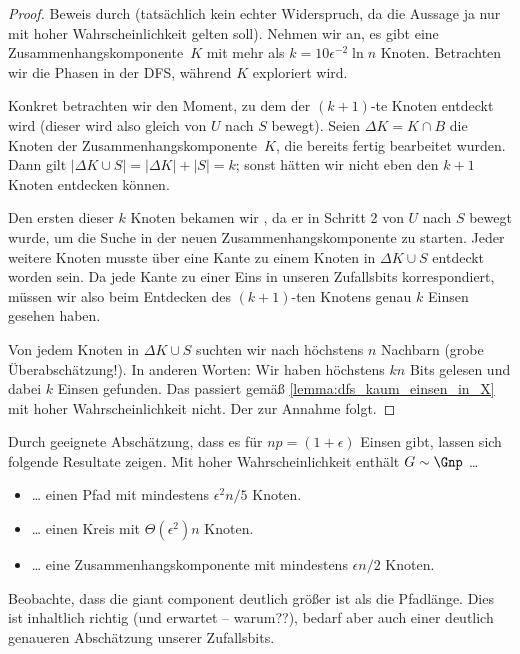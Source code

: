 \begin{proof}
    Beweis durch  (tatsächlich kein echter Widerspruch, da die Aussage ja nur mit hoher Wahrscheinlichkeit gelten soll).
    Nehmen wir an, es gibt eine Zusammenhangskomponente~$K$ mit mehr als $k = 10 \epsilon^{-2} \ln n$ Knoten.
    Betrachten wir die Phasen in der DFS, während $K$ exploriert wird.

    Konkret betrachten wir den Moment, zu dem der $(k+1)$-te Knoten entdeckt wird (dieser wird also gleich von $U$ nach $S$ bewegt).
    Seien $\Delta K = K \cap B$ die Knoten der Zusammenhangskomponente~$K$, die bereits fertig bearbeitet wurden.
    Dann gilt $|\Delta K \cup S| = |\Delta K| + |S| = k$; sonst hätten wir nicht eben den $k+1$ Knoten entdecken können.

    Den ersten dieser $k$ Knoten bekamen wir , da er in Schritt 2 von $U$ nach $S$ bewegt wurde, um die Suche in der neuen Zusammenhangskomponente zu starten.
    Jeder weitere Knoten musste über eine Kante zu einem Knoten in $\Delta K \cup S$ entdeckt worden sein.
    Da jede Kante zu einer Eins in unseren Zufallsbits korrespondiert, müssen wir also beim Entdecken des $(k+1)$-ten Knotens genau $k$ Einsen gesehen haben.

    Von jedem Knoten in $\Delta K \cup S$ suchten wir nach höchstens $n$ Nachbarn (grobe Überabschätzung!).
    In anderen Worten: Wir haben höchstens $k n$ Bits gelesen und dabei $k$ Einsen gefunden.
    Das passiert gemäß \cref{lemma:dfs_kaum_einsen_in_X} mit hoher Wahrscheinlichkeit nicht.
    Der  zur Annahme folgt.
\end{proof}

Durch geeignete Abschätzung, dass es für $np = (1 + \epsilon)$  Einsen gibt, lassen sich folgende Resultate zeigen.
Mit hoher Wahrscheinlichkeit enthält $G \sim \Gnp$ \ldots
\begin{itemize}
    \item \ldots{} einen Pfad mit mindestens $\epsilon^2 n / 5$ Knoten.
    \item \ldots{} einen Kreis mit $\Theta(\epsilon^2) n$ Knoten.
    \item \ldots{} eine Zusammenhangskomponente mit mindestens $\epsilon n / 2$ Knoten.
\end{itemize}

Beobachte, dass die giant component deutlich größer ist als die Pfadlänge.
Dies ist inhaltlich richtig (und erwartet -- warum??), bedarf aber auch einer deutlich genaueren Abschätzung unserer Zufallsbits.

